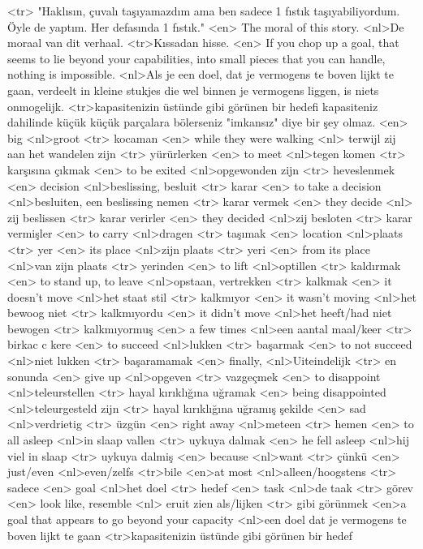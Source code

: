 <tr> "Haklısın, çuvalı taşıyamazdım ama ben sadece 1 fıstık taşıyabiliyordum. Öyle de yaptım. Her defasında 1 fıstık." 
<en> The moral of this story. 
<nl>De moraal van dit verhaal. 
<tr>Kıssadan hisse.
<en> If you chop up a goal, that seems to lie beyond your capabilities, into small pieces that you can handle, nothing is impossible.
<nl>Als je een doel, dat je vermogens te boven lijkt te gaan, verdeelt in kleine stukjes die wel binnen je vermogens liggen, is niets onmogelijk. 
<tr>kapasitenizin üstünde gibi görünen bir hedefi kapasiteniz dahilinde küçük küçük parçalara bölerseniz "imkansız" diye bir şey olmaz. 
<en> big 
<nl>groot 
<tr> kocaman 
<en> while they were walking 
<nl> terwijl zij aan het wandelen zijn 
<tr> yürürlerken
<en> to meet 
<nl>tegen komen 
<tr> karşısına çıkmak 
<en> to be exited 
<nl>opgewonden zijn 
<tr> heveslenmek 
<en> decision 
<nl>beslissing, besluit 
<tr>  karar 
<en> to take a decision 
<nl>besluiten, een beslissing nemen 
<tr> karar vermek 
<en> they decide 
<nl> zij beslissen 
<tr> karar verirler 
<en> they decided
<nl>zij besloten 
<tr> karar vermişler
<en> to carry 
<nl>dragen 
<tr> taşımak
<en> location 
<nl>plaats 
<tr> yer 
<en> its place 
<nl>zijn plaats 
<tr> yeri  
<en> from its place 
<nl>van zijn plaats 
<tr> yerinden 
<en> to lift 
<nl>optillen 
<tr> kaldırmak 
<en>  to stand up, to leave 
<nl>opstaan, vertrekken 
<tr> kalkmak 
<en> it doesn't move 
<nl>het staat stil 
<tr> kalkmıyor 
<en> it wasn't moving 
<nl>het bewoog niet 
<tr> kalkmıyordu   
<en> it didn't move 
<nl>het heeft/had niet bewogen 
<tr>  kalkmıyormuş 
<en> a few times  
<nl>een aantal maal/keer 
<tr> birkac c kere 
<en> to succeed 
<nl>lukken 
<tr> başarmak 
<en> to not succeed 
<nl>niet  lukken 
<tr> başaramamak 
<en> finally, 
<nl>Uiteindelijk 
<tr> en sonunda 
<en> give up 
<nl>opgeven 
<tr> vazgeçmek 
<en> to disappoint 
<nl>teleurstellen 
<tr> hayal kırıklığına uğramak 
<en> being disappointed 
<nl>teleurgesteld zijn 
<tr> hayal kırıklığına uğramış şekilde 
<en> sad 
<nl>verdrietig 
<tr> üzgün
<en> right away 
<nl>meteen 
<tr> hemen 
<en> to all asleep 
<nl>in slaap vallen 
<tr> uykuya dalmak
<en> he fell asleep 
<nl>hij viel in slaap 
<tr> uykuya dalmiş 
<en> because 
<nl>want 
<tr> çünkü  
<en> just/even  
<nl>even/zelfs 
<tr>bile  
<en>at most 
<nl>alleen/hoogstens 
<tr> sadece
<en> goal 
<nl>het  doel 
<tr> hedef 
<en> task 
<nl>de taak 
<tr> görev 
<en> look like, resemble 
<nl> eruit zien als/lijken 
<tr> gibi görünmek 
<en>a goal that appears to go beyond your capacity 
<nl>een doel dat je vermogens te boven lijkt te  gaan 
<tr>kapasitenizin üstünde gibi görünen bir hedef
